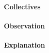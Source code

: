 \documentclass[10pt,letterpaper]{article}
\begin{document}
\paragraph{Collectives}

\paragraph{Observation}

\paragraph{Explanation}
\end{document}
